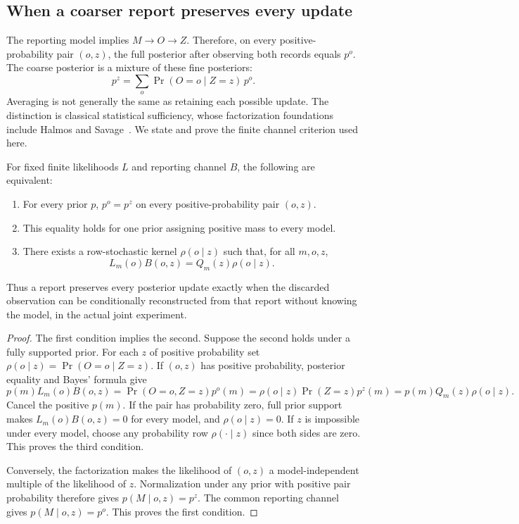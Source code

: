 \subsection{When a coarser report preserves every update}
The reporting model implies $M\to O\to Z$. Therefore, on every positive-probability pair $(o,z)$, the full posterior after observing both records equals $p^o$. The coarse posterior is a mixture of these fine posteriors:
\begin{equation}\label{MU:eq:posterior-mixture}
p^z=\sum_o\Pr(O=o\mid Z=z)\,p^o.
\end{equation}
Averaging is not generally the same as retaining each possible update. The distinction is classical statistical sufficiency, whose factorization foundations include Halmos and Savage~\cite{MU:halmos}. We state and prove the finite channel criterion used here.

\begin{MUtheorem}\label{MU:thm:bayes}
For fixed finite likelihoods $L$ and reporting channel $B$, the following are equivalent:
\begin{enumerate}[label=(\roman*)]
\item For every prior $p$, $p^o=p^z$ on every positive-probability pair $(o,z)$.
\item This equality holds for one prior assigning positive mass to every model.
\item There exists a row-stochastic kernel $\rho(o\mid z)$ such that, for all $m,o,z$,
\begin{equation}\label{MU:eq:bayes-factorization}
L_m(o)B(o,z)=Q_m(z)\rho(o\mid z).
\end{equation}
\end{enumerate}
Thus a report preserves every posterior update exactly when the discarded observation can be conditionally reconstructed from that report without knowing the model, in the actual joint experiment.
\end{MUtheorem}
\begin{proof}
The first condition implies the second. Suppose the second holds under a fully supported prior. For each $z$ of positive probability set $\rho(o\mid z)=\Pr(O=o\mid Z=z)$. If $(o,z)$ has positive probability, posterior equality and Bayes' formula give
\[
p(m)L_m(o)B(o,z)
=\Pr(O=o,Z=z)p^o(m)
=\rho(o\mid z)\Pr(Z=z)p^z(m)
=p(m)Q_m(z)\rho(o\mid z).
\]
Cancel the positive $p(m)$. If the pair has probability zero, full prior support makes $L_m(o)B(o,z)=0$ for every model, and $\rho(o\mid z)=0$. If $z$ is impossible under every model, choose any probability row $\rho(\cdot\mid z)$ since both sides are zero. This proves the third condition.

Conversely, the factorization makes the likelihood of $(o,z)$ a model-independent multiple of the likelihood of $z$. Normalization under any prior with positive pair probability therefore gives $p(M\mid o,z)=p^z$. The common reporting channel gives $p(M\mid o,z)=p^o$. This proves the first condition.
\end{proof}

